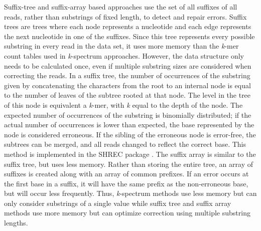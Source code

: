 Suffix-tree and suffix-array based approaches use the set of all suffixes of all reads, rather than substrings of fixed length, to detect and repair errors. Suffix trees are trees where each node represents a nucleotide and each edge represents the next nucleotide in one of the suffixes. Since this tree represents every possible substring in every read in the data set, it uses more memory than the \textit{k}-mer count tables used in \textit{k}-spectrum approaches. However, the data structure only needs to be calculated once, even if multiple substring sizes are considered when correcting the reads.
In a suffix tree, the number of occurrences of the substring given by concatenating the characters from the root to an internal node is equal to the number of leaves of the subtree rooted at that node. The level in the tree of this node is equivalent a \textit{k}-mer, with \textit{k} equal to the depth of the node. The expected number of occurrences of the substring is binomially distributed; if the actual number of occurrences is lower than expected, the base represented by the node is considered erroneous. If the sibling of the erroneous node is error-free, the subtrees can be merged, and all reads changed to reflect the correct base. This method is implemented in the SHREC package \parencite{schroder_shrec:_2009}.
The suffix array is similar to the suffix tree, but uses less memory. Rather than storing the entire tree, an array of suffixes is created along with an array of common prefixes. If an error occurs at the first base in a suffix, it will have the same prefix as the non-erroneous base, but will occur less frequently.
Thus, \textit{k}-spectrum methods use less memory but can only consider substrings of a single value while suffix tree and suffix array methods use more memory but can optimize correction using multiple substring lengths.


